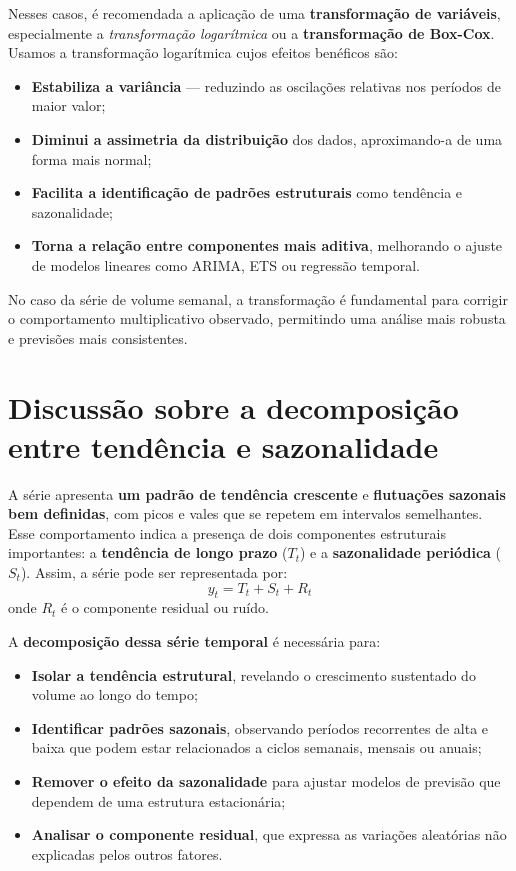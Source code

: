 \documentclass{article}
\begin{document}
Nesses casos, é recomendada a aplicação de uma \textbf{transformação de variáveis}, especialmente a \textit{transformação logarítmica} ou a \textbf{transformação de Box-Cox}.  
Usamos a transformação logarítmica cujos efeitos benéficos são:

\begin{itemize}
    \item \textbf{Estabiliza a variância} — reduzindo as oscilações relativas nos períodos de maior valor;
    \item \textbf{Diminui a assimetria da distribuição} dos dados, aproximando-a de uma forma mais normal;
    \item \textbf{Facilita a identificação de padrões estruturais} como tendência e sazonalidade;
    \item \textbf{Torna a relação entre componentes mais aditiva}, melhorando o ajuste de modelos lineares como ARIMA, ETS ou regressão temporal.
\end{itemize}

No caso da série de volume semanal, a transformação é fundamental para corrigir o comportamento multiplicativo observado, permitindo uma análise mais robusta e previsões mais consistentes.

\vspace{1em}

\section*{Discussão sobre a decomposição entre tendência e sazonalidade}

A série apresenta \textbf{um padrão de tendência crescente} e \textbf{flutuações sazonais bem definidas}, com picos e vales que se repetem em intervalos semelhantes. Esse comportamento indica a presença de dois componentes estruturais importantes: a \textbf{tendência de longo prazo} ($T_t$) e a \textbf{sazonalidade periódica} ($S_t$). Assim, a série pode ser representada por:
\[
y_t = T_t + S_t + R_t
\]
onde $R_t$ é o componente residual ou ruído.

A \textbf{decomposição dessa série temporal} é necessária para:

\begin{itemize}
    \item \textbf{Isolar a tendência estrutural}, revelando o crescimento sustentado do volume ao longo do tempo;
    \item \textbf{Identificar padrões sazonais}, observando períodos recorrentes de alta e baixa que podem estar relacionados a ciclos semanais, mensais ou anuais;
    \item \textbf{Remover o efeito da sazonalidade} para ajustar modelos de previsão que dependem de uma estrutura estacionária;
    \item \textbf{Analisar o componente residual}, que expressa as variações aleatórias não explicadas pelos outros fatores.
\end{itemize}
\end{document}

